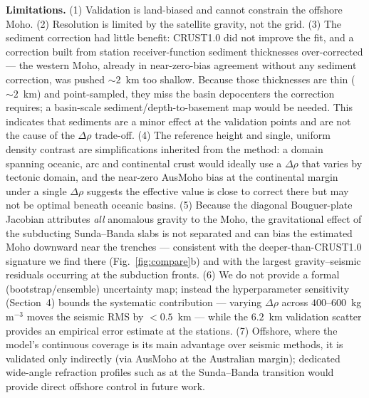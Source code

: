 \documentclass[extra,mreferee]{gji}
\begin{document}
\textbf{Limitations.} (1) Validation is land-biased and cannot constrain the
offshore Moho. (2) Resolution is limited by the satellite gravity, not the grid.
(3) The sediment correction had little benefit: {CRUST1.0} did not improve the
fit, and a correction built from station receiver-function sediment thicknesses
\citep{bahri2021} over-corrected --- the western Moho, already in near-zero-bias
agreement without any sediment correction, was pushed $\sim2$~km too shallow.
Because those thicknesses are thin ($\sim2$~km) and point-sampled, they miss the
basin depocenters the correction requires; a basin-scale sediment/depth-to-basement
map \citep{hardy1997,darman2020,esdm2022} would be needed. This indicates that
sediments are a minor effect at the validation points and are not the cause of the
$\Delta\rho$ trade-off. (4) The reference height and single, uniform density
contrast are simplifications inherited from the method: a domain spanning oceanic,
arc and continental crust would ideally use a $\Delta\rho$ that varies by tectonic
domain, and the near-zero {AusMoho} bias at the continental margin under a single
$\Delta\rho$ suggests the effective value is close to correct there but may not be
optimal beneath oceanic basins. (5) Because the diagonal Bouguer-plate Jacobian
attributes \emph{all} anomalous gravity to the Moho, the gravitational effect of
the subducting Sunda--Banda slabs is not separated and can bias the estimated Moho
downward near the trenches --- consistent with the deeper-than-{CRUST1.0}
signature we find there (Fig.~\ref{fig:compare}b) and with the largest
gravity--seismic residuals occurring at the subduction fronts. (6) We do not
provide a formal (bootstrap/ensemble) uncertainty map; instead the hyperparameter
sensitivity (Section~4) bounds the systematic contribution --- varying $\Delta\rho$
across $400$--$600$~kg\,m$^{-3}$ moves the seismic RMS by $<0.5$~km --- while the
$6.2$~km validation scatter provides an empirical error estimate at the stations.
(7) Offshore, where the model's continuous coverage is its main advantage over
seismic methods, it is validated only indirectly (via {AusMoho} at the Australian
margin); dedicated wide-angle refraction profiles such as \citet{planert2010} at
the Sunda--Banda transition would provide direct offshore control in future work.

\end{document}
